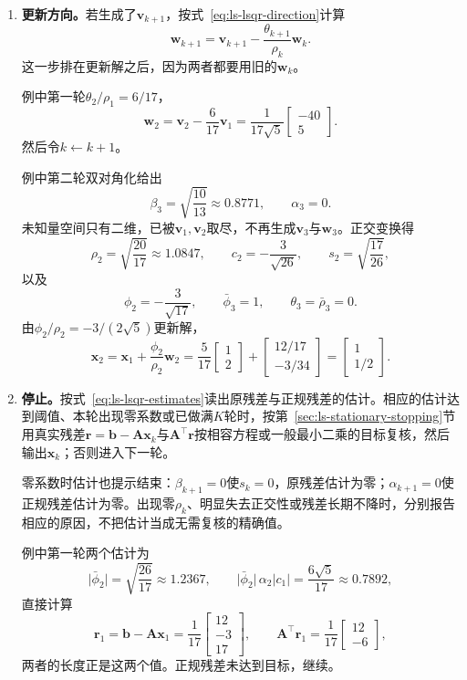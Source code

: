 \begin{enumerate}
 \item \textbf{更新方向。}若生成了$\bm v_{k+1}$，按式~\eqref{eq:ls-lsqr-direction}计算
 \[
  \bm w_{k+1}=\bm v_{k+1}-\frac{\theta_{k+1}}{\rho_k}\bm w_k .
 \]
 这一步排在更新解之后，因为两者都要用旧的$\bm w_k$。

 例中第一轮$\theta_2/\rho_1=6/17$，
 \[
  \bm w_2=\bm v_2-\frac6{17}\bm v_1=\frac1{17\sqrt5}\begin{bmatrix}-40\\5\end{bmatrix}.
 \]
 然后令$k\leftarrow k+1$。

 例中第二轮双对角化给出
 \[
  \beta_3=\sqrt{\frac{10}{13}}\approx0.8771,\qquad \alpha_3=0 .
 \]
 未知量空间只有二维，已被$\bm v_1,\bm v_2$取尽，不再生成$\bm v_3$与$\bm w_3$。正交变换得
 \[
  \rho_2=\sqrt{\frac{20}{17}}\approx1.0847,\qquad c_2=-\frac3{\sqrt{26}},\qquad s_2=\sqrt{\frac{17}{26}},
 \]
 以及
 \[
  \phi_2=-\frac3{\sqrt{17}},\qquad \bar\phi_3=1,\qquad \theta_3=\bar\rho_3=0 .
 \]
 由$\phi_2/\rho_2=-3/(2\sqrt5)$更新解，
 \[
  \bm x_2=\bm x_1+\frac{\phi_2}{\rho_2}\bm w_2
  =\frac5{17}\begin{bmatrix}1\\2\end{bmatrix}+\begin{bmatrix}12/17\\-3/34\end{bmatrix}
  =\begin{bmatrix}1\\1/2\end{bmatrix}.
 \]

 \item \textbf{停止。}按式~\eqref{eq:ls-lsqr-estimates}读出原残差与正规残差的估计。相应的估计达到阈值、本轮出现零系数或已做满$K$轮时，按第~\ref{sec:ls-stationary-stopping}节用真实残差$\bm r=\bm b-\bm A\bm x_k$与$\bm A^\top\bm r$按相容方程或一般最小二乘的目标复核，然后输出$\bm x_k$；否则进入下一轮。

 零系数时估计也提示结束：$\beta_{k+1}=0$使$s_k=0$，原残差估计为零；$\alpha_{k+1}=0$使正规残差估计为零。出现零$\rho_k$、明显失去正交性或残差长期不降时，分别报告相应的原因，不把估计当成无需复核的精确值。

 例中第一轮两个估计为
 \[
  \lvert\bar\phi_2\rvert=\sqrt{\frac{26}{17}}\approx1.2367,\qquad
  \lvert\bar\phi_2\rvert\,\alpha_2\lvert c_1\rvert=\frac{6\sqrt5}{17}\approx0.7892 ,
 \]
 直接计算
 \[
  \bm r_1=\bm b-\bm A\bm x_1=\frac1{17}\begin{bmatrix}12\\-3\\17\end{bmatrix},\qquad
  \bm A^\top\bm r_1=\frac1{17}\begin{bmatrix}12\\-6\end{bmatrix},
 \]
 两者的长度正是这两个值。正规残差未达到目标，继续。


\end{enumerate}
